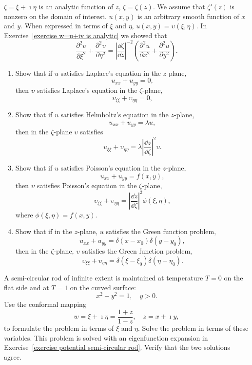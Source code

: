 {\begin{Exercise}
  $\zeta = \xi + \imath \eta$ is an analytic function of $z$, $\zeta = \zeta(z)$.
  We assume that $\zeta'(z)$ is nonzero on the domain of interest.
  $u(x, y)$ is an arbitrary smooth function of $x$ and $y$.  
  When expressed in terms of $\xi$ and $\eta$, $u(x, y) = \upsilon(\xi, \eta)$.  
  In Exercise~\ref{exercise w=u+iv is analytic} we showed that
  \[
  \frac{\partial^2 \upsilon}{\partial \xi^2} + \frac{\partial^2 \upsilon}{\partial \eta^2} =
  \left| \frac{\dd \zeta}{\dd z} \right|^{-2}
  \left( \frac{\partial^2 u}{\partial x^2} + \frac{\partial^2 u}{\partial y^2} \right).
  \]
  \begin{enumerate}
  \item
    Show that if $u$ satisfies Laplace's equation in the $z$-plane, 
    \[
    u_{x x} + u_{y y} = 0,
    \]
    then $\upsilon$ satisfies Laplace's equation in the $\zeta$-plane,
    \[
    \upsilon_{\xi \xi} + \upsilon_{\eta \eta} = 0,
    \]
  \item
    Show that if $u$ satisfies Helmholtz's equation in the $z$-plane, 
    \[
    u_{x x} + u_{y y} = \lambda u,
    \]
    then in the $\zeta$-plane $\upsilon$ satisfies
    \[
    \upsilon_{\xi \xi} + \upsilon_{\eta \eta} = \lambda \left| \frac{\dd z}{\dd \zeta} \right|^2 \upsilon.
    \]
  \item
    Show that if $u$ satisfies Poisson's equation in the $z$-plane, 
    \[
    u_{x x} + u_{y y} = f(x,y),
    \]
    then $\upsilon$ satisfies Poisson's equation in the $\zeta$-plane,
    \[
    \upsilon_{\xi \xi} + \upsilon_{\eta \eta} = \left| \frac{\dd z}{\dd \zeta} \right|^2 \phi(\xi,\eta),
    \]
    where $\phi(\xi,\eta) = f(x,y)$.
  \item
    Show that if in the $z$-plane, $u$ satisfies the Green function problem,
    \[
    u_{x x} + u_{y y} = \delta(x-x_0) \delta(y-y_0),
    \]
    then in the $\zeta$-plane, $\upsilon$ satisfies the Green function problem,
    \[
    \upsilon_{\xi \xi} + \upsilon_{\eta \eta} = \delta(\xi-\xi_0) \delta(\eta-\eta_0).
    \]
  \end{enumerate}
\end{Exercise}









\begin{Exercise}
  A semi-circular rod of infinite extent is maintained at temperature
  $T = 0$ on the flat side and at $T = 1$ on the curved surface:
  \[
  x^2 + y^2 = 1, \quad y > 0.
  \]
  Use the conformal mapping
  \[
  w = \xi + \imath \eta = \frac{1+z}{1-z}, \quad z = x + \imath y,
  \]
  to formulate the problem in terms of $\xi$ and $\eta$.  Solve the 
  problem in terms of these variables.
  This problem is solved with an eigenfunction expansion in
  Exercise~\ref{exercise potential semi-circular rod}.  
  Verify that the two solutions agree.
\end{Exercise}



}
